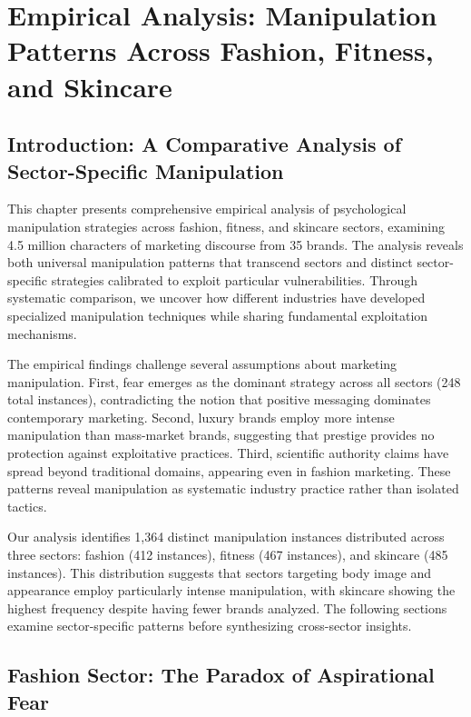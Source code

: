 
\chapter{Empirical Analysis: Manipulation Patterns Across Fashion, Fitness, and Skincare}
\label{ch:empirical_analysis}

\section{Introduction: A Comparative Analysis of Sector-Specific Manipulation}
\label{sec:empirical_intro}

This chapter presents comprehensive empirical analysis of psychological manipulation strategies across fashion, fitness, and skincare sectors, examining 4.5 million characters of marketing discourse from 35 brands. The analysis reveals both universal manipulation patterns that transcend sectors and distinct sector-specific strategies calibrated to exploit particular vulnerabilities. Through systematic comparison, we uncover how different industries have developed specialized manipulation techniques while sharing fundamental exploitation mechanisms.

The empirical findings challenge several assumptions about marketing manipulation. First, fear emerges as the dominant strategy across all sectors (248 total instances), contradicting the notion that positive messaging dominates contemporary marketing. Second, luxury brands employ more intense manipulation than mass-market brands, suggesting that prestige provides no protection against exploitative practices. Third, scientific authority claims have spread beyond traditional domains, appearing even in fashion marketing. These patterns reveal manipulation as systematic industry practice rather than isolated tactics.

Our analysis identifies 1,364 distinct manipulation instances distributed across three sectors: fashion (412 instances), fitness (467 instances), and skincare (485 instances). This distribution suggests that sectors targeting body image and appearance employ particularly intense manipulation, with skincare showing the highest frequency despite having fewer brands analyzed. The following sections examine sector-specific patterns before synthesizing cross-sector insights.

\section{Fashion Sector: The Paradox of Aspirational Fear}
\label{sec:fashion_analysis}

